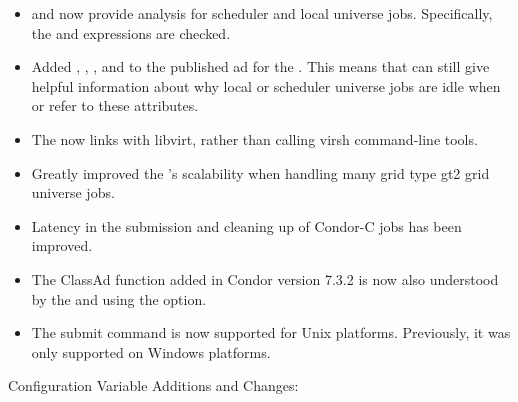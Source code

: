 \begin{itemize}

\item {}  and  now provide
  analysis for scheduler and local universe jobs.  Specifically, the
   and
   expressions are checked.

\item Added , ,
, and 
to the published ad for the .  This means that
  can still give helpful information about
why local or scheduler universe jobs are idle when
 or
 refer to these attributes.

\item The  now links with libvirt, rather than calling
virsh command-line tools.

\item Greatly improved the 's scalability when handling
many grid type gt2 grid universe jobs.

\item Latency in the submission and cleaning up of Condor-C jobs
has been improved.

\item The  ClassAd function added in Condor version 7.3.2
is now also understood by the  and
 using the  option.

\item The submit command  is now supported
for Unix platforms. Previously, it was only supported on Windows platforms.

\end{itemize}

\noindent Configuration Variable Additions and Changes:

